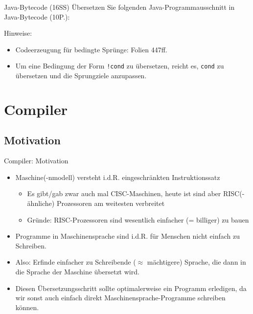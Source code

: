 \documentclass{beamer}
\newcommand{\code}[1]{
	\begin{mdframed}
		
	\end{mdframed}
}
\begin{document}
\begin{frame}{Java-Bytecode (16SS)}
	\footnotesize
	Übersetzen Sie folgenden Java-Programmausschnitt in Java-Bytecode (10P.):

	\code{code/bytecode16ss.java}

	\pause
	Hinweise:

	\begin{itemize}
		\item Codeerzeugung für bedingte Sprünge: Folien 447ff.
		\item Um eine Bedingung der Form \texttt{!cond} zu übersetzen, reicht es, \texttt{cond} zu übersetzen und die Sprungziele anzupassen.
	\end{itemize}
\end{frame}


\section{Compiler}

\subsection{Motivation}

\begin{frame}{Compiler: Motivation}
	\begin{itemize}
		\item Maschine(-nmodell) versteht i.d.R. eingeschränkten Instruktionssatz
		\begin{itemize}
			\item Es gibt/gab zwar auch mal CISC-Maschinen, heute ist sind aber RISC(-ähnliche) Prozessoren am weitesten verbreitet
			\item Gründe: RISC-Prozessoren sind wesentlich einfacher (= billiger) zu bauen
		\end{itemize}
		\item Programme in Maschinensprache sind i.d.R. für Menschen nicht einfach zu Schreiben.
		\pause
		\item Also: Erfinde einfacher zu Schreibende ($\approx$ mächtigere) Sprache, die dann in die Sprache der Maschine übersetzt wird.
		\item Diesen Übersetzungsschritt sollte optimalerweise ein Programm erledigen, da wir sonst auch einfach direkt Maschinensprache-Programme schreiben können.
	\end{itemize}
\end{frame}
\end{document}

